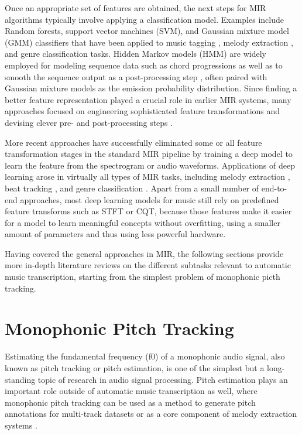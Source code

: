 Once an appropriate set of features are obtained, the next steps for MIR algorithms typically involve applying a classification model.
Examples include Random forests, support vector machines (SVM), and Gaussian mixture model (GMM) classifiers that have been applied to music tagging \cite{ness2009tag}, melody extraction \cite{bittner2015contour}, and genre classification \cite{tzanetakis2002genre} tasks.
Hidden Markov models (HMM) are widely employed for modeling sequence data such as chord progressions \cite{cho2010chord} as well as to smooth the sequence output as a post-processing step \cite{khadkevich2009hmm}, often paired with Gaussian mixture models as the emission probability distribution.
Since finding a better feature representation played a crucial role in earlier MIR systems, many approaches focused on engineering sophisticated feature transformations \cite{harte2006tonnetz} and devising clever pre- and post-processing steps \cite{oudre2009chord}.


More recent approaches have successfully eliminated some or all feature transformation stages in the standard MIR pipeline by training a deep model to learn the feature from the spectrogram or audio waveforms.
Applications of deep learning arose in virtually all types of MIR tasks, including melody extraction \cite{bittner2017deepsalience}, beat tracking \cite{vogl2017drum}, and genre classification \cite{oramas2017genre}.
Apart from a small number of end-to-end approaches, most deep learning models for music still rely on predefined feature transforms such as STFT or CQT, because those features make it easier for a model to learn meaningful concepts without overfitting, using a smaller amount of parameters and thus using less powerful hardware.

Having covered the general approaches in MIR, the following sections provide more in-depth literature reviews on the different subtasks relevant to automatic music transcription, starting from the simplest problem of monophonic picth tracking.


\section{Monophonic Pitch Tracking}\label{sec:monophonic}

Estimating the fundamental frequency (f0) of a monophonic audio signal, also known as pitch tracking or pitch estimation, is one of the simplest but a long-standing topic of research in audio signal processing.
Pitch estimation plays an important role outside of automatic music transcription as well, where monophonic pitch tracking can be used as a method to generate pitch annotations for multi-track datasets \cite{bittner2014medleydb} or as a core component of melody extraction systems \cite{bosch2014melody, mauch2015computer}.

